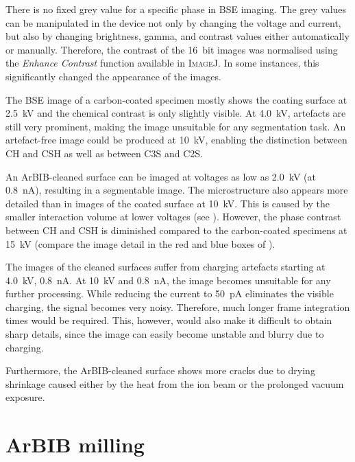 There is no fixed grey value for a specific phase in \ac{BSE} imaging.
The grey values can be manipulated in the device not only by changing the voltage and current, but also by changing brightness, gamma, and contrast values either automatically or manually.
Therefore, the contrast of the \qty{16}{bit} images was normalised using the \textit{Enhance Contrast} function available in \textsc{ImageJ}.
In some instances, this significantly changed the appearance of the images.

The \ac{BSE} image of a carbon-coated specimen mostly shows the coating surface at \qty{2.5}{\kilo\volt} and the chemical contrast is only slightly visible.
At \qty{4.0}{\kilo\volt}, artefacts are still very prominent, making the image unsuitable for any segmentation task.
An artefact-free image could be produced at \qty{10}{\kilo\volt}, enabling the distinction between \ac{CH} and \ac{CSH} as well as between \ac{C3S} and \ac{C2S}.

An \ac{ArBIB}-cleaned surface can be imaged at voltages as low as \qty{2.0}{\kilo\volt} (at \qty{0.8}{\nano\ampere}), resulting in a segmentable image.
The microstructure also appears more detailed than in images of the coated surface at \qty{10}{\kilo\volt}.
This is caused by the smaller interaction volume at lower voltages (see ).
However, the phase contrast between \ac{CH} and \ac{CSH} is diminished compared to the carbon-coated specimens at \qty{15}{\kilo\volt} (compare the image detail in the red and blue boxes of ).

The images of the cleaned surfaces suffer from charging artefacts starting at \qty{4.0}{\kilo\volt}, \qty{0.8}{\nano\ampere}.
At \qty{10}{\kilo\volt} and \qty{0.8}{\nano\ampere}, the image becomes unsuitable for any further processing.
While reducing the current to \qty{50}{\pico\ampere} eliminates the visible charging, the signal becomes very noisy.
Therefore, much longer frame integration times would be required.
This, however, would also make it difficult to obtain sharp details, since the image can easily become unstable and blurry due to charging.

Furthermore, the \ac{ArBIB}-cleaned surface shows more cracks due to drying shrinkage caused either by the heat from the ion beam or the prolonged vacuum exposure.

\section{\acs*{ArBIB} milling}
\label{sec:bib_pol_fixed_results}

